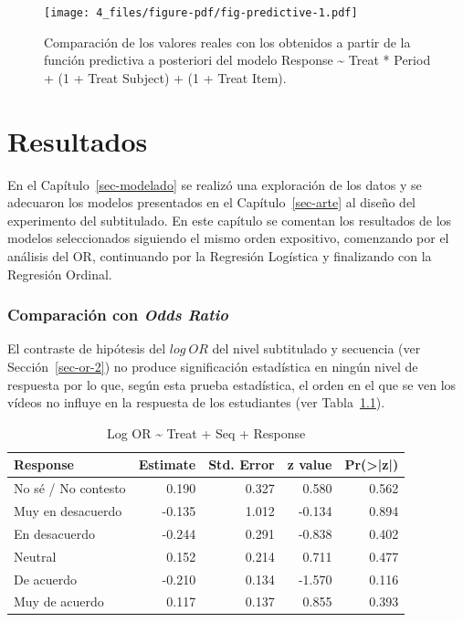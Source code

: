 \documentclass[
  12pt,
  a4paper,
  extrafontsizes,
  onecolumn,
  openright,
  table]{memoir}
\begin{document}
\begin{figure}[h]

{\centering \texttt{[image: 4\_files/figure-pdf/fig-predictive-1.pdf]}

}

\caption[Verificación usando la función predictiva a posteriori del
modelo seleccionado.]{\label{fig-predictive}Comparación de los valores
reales con los obtenidos a partir de la función predictiva a posteriori
del modelo Response \textasciitilde{} Treat * Period + (1 + Treat
\textbar{} Subject) + (1 + Treat \textbar{} Item).}

\end{figure}


\hypertarget{sec-resultados}{%
\chapter{Resultados}\label{sec-resultados}}

En el Capítulo~\ref{sec-modelado} se realizó una exploración de los
datos y se adecuaron los modelos presentados en el
Capítulo~\ref{sec-arte} al diseño del experimento del subtitulado. En
este capítulo se comentan los resultados de los modelos seleccionados
siguiendo el mismo orden expositivo, comenzando por el análisis del
\gls{OR}, continuando por la \gls{Regresión Logística} y finalizando con
la \gls{Regresión Ordinal}.

\hypertarget{sec-or-3}{%
\subsection{\texorpdfstring{Comparación con \emph{Odds
Ratio}}{Comparación con Odds Ratio}}\label{sec-or-3}}

El contraste de hipótesis del \(log\ OR\) del nivel subtitulado y
secuencia (ver Sección~\ref{sec-or-2}) no produce significación
estadística en ningún nivel de respuesta por lo que, según esta prueba
estadística, el orden en el que se ven los vídeos no influye en la
respuesta de los estudiantes (ver Tabla~\ref{tbl-logor1}).

\hypertarget{tbl-logor1}{}
\begin{longtable}{lrrrr}
\caption{\label{tbl-logor1}Log OR \textasciitilde{} Treat + Seq + Response }\tabularnewline

\toprule
Response & Estimate & Std. Error & z value & Pr(>|z|) \\ 
\midrule
No sé / No contesto & 0.190 & 0.327 & 0.580 & 0.562 \\ 
Muy en desacuerdo & -0.135 & 1.012 & -0.134 & 0.894 \\ 
En desacuerdo & -0.244 & 0.291 & -0.838 & 0.402 \\ 
Neutral & 0.152 & 0.214 & 0.711 & 0.477 \\ 
De acuerdo & -0.210 & 0.134 & -1.570 & 0.116 \\ 
Muy de acuerdo & 0.117 & 0.137 & 0.855 & 0.393 \\ 
\bottomrule
\end{longtable}
\end{document}
